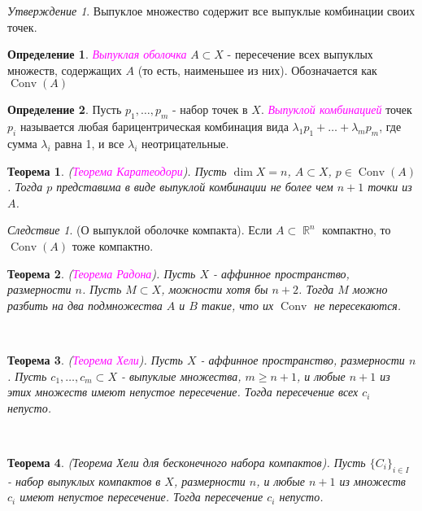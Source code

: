 \documentclass[a4paper,100pt]{article}
\theoremstyle{indented}
\newtheorem{theorem}{Теорема}
\theoremstyle{definition}
\newtheorem{defn}{Определение}
\theoremstyle{remark}
\newtheorem{cons}{Следствие}
\newtheorem{stat}{Утверждение}
\DeclareMathOperator{\Conv}{Conv}
\DeclareMathOperator{\RR}{\mathbb{R}}
\begin{document}
\begin{stat}
    Выпуклое множество содержит все выпуклые комбинации своих точек.
\end{stat}

\begin{defn}
    \textit{\textcolor{magenta}{\hypertarget{s90}{Выпуклая оболочка}}} $A\subset X$ - пересечение всех выпуклых множеств, содержащих $A$ (то есть, наименьшее из них). Обозначается как $\Conv(A)$
\end{defn}

\begin{defn}
    Пусть $p_1, \ldots, p_m$ - набор точек в $X$. \textit{\textcolor{magenta}{\hypertarget{s91}{Выпуклой комбинацией}}} точек $p_i$ называется любая барицентрическая комбинация вида $\lambda_1 p_1 + \ldots + \lambda_m p_m$, где сумма $\lambda_i$ равна 1, и все $\lambda_i$ неотрицательные.
\end{defn}

\begin{theorem}
    (\textit{\textcolor{magenta}{\hypertarget{s92}{Теорема Каратеодори}}}). Пусть $\dim X = n$, $A\subset X$, $p\in \Conv (A)$. Тогда $p$ представима в виде выпуклой комбинации не более чем $n+1$ точки из $A$. 
\end{theorem}

\begin{cons}
    (О выпуклой оболочке компакта). Если $A\subset \RR^n$ компактно, то $\Conv(A)$ тоже компактно.
\end{cons}

\begin{theorem}
    (\textit{\textcolor{magenta}{\hypertarget{s93}{Теорема Радона}}}). Пусть $X$ - аффинное пространство, размерности $n$. Пусть $M \subset X$, можности хотя бы $n+2$. Тогда $M$ можно разбить на два подмножества $A$ и $B$ такие, что их $\Conv$ не пересекаются.
\end{theorem} \ 

\begin{theorem}
    (\textit{\textcolor{magenta}{\hypertarget{s94}{Теорема Хели}}}). Пусть $X$ - аффинное пространство, размерности $n$. Пусть $c_1, \ldots, c_m \subset X$ - выпуклые множества, $m \geq n+1$, и любые $n+1$ из этих множеств имеют непустое пересечение. Тогда пересечение всех $c_i$ непусто.
\end{theorem} \

\begin{theorem}
    (Теорема Хели для бесконечного набора компактов). Пусть $\{C_i\}_{i \in I}$ - набор выпуклых компактов в $X$, размерности $n$, и любые $n+1$ из множеств $c_i$ имеют непустое пересечение. Тогда пересечение $c_i$ непусто.
\end{theorem} \
\end{document}
